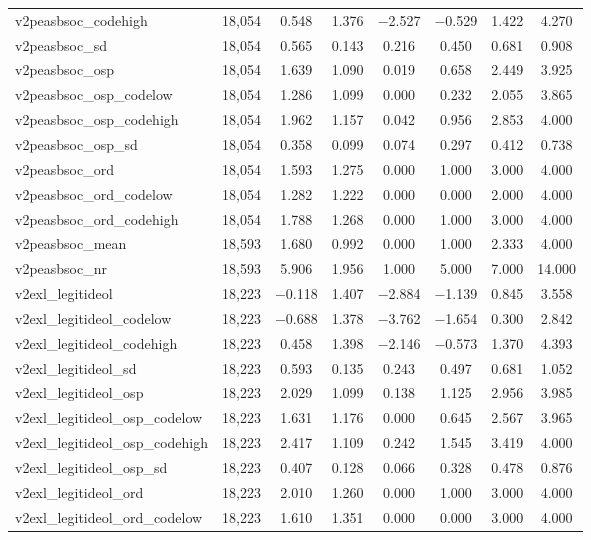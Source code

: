 \begin{table}[!htbp]
\begin{tabular}{@{\extracolsep{5pt}}lccccccc}
v2peasbsoc\_codehigh & 18,054 & 0.548 & 1.376 & $-$2.527 & $-$0.529 & 1.422 & 4.270 \\ 
v2peasbsoc\_sd & 18,054 & 0.565 & 0.143 & 0.216 & 0.450 & 0.681 & 0.908 \\ 
v2peasbsoc\_osp & 18,054 & 1.639 & 1.090 & 0.019 & 0.658 & 2.449 & 3.925 \\ 
v2peasbsoc\_osp\_codelow & 18,054 & 1.286 & 1.099 & 0.000 & 0.232 & 2.055 & 3.865 \\ 
v2peasbsoc\_osp\_codehigh & 18,054 & 1.962 & 1.157 & 0.042 & 0.956 & 2.853 & 4.000 \\ 
v2peasbsoc\_osp\_sd & 18,054 & 0.358 & 0.099 & 0.074 & 0.297 & 0.412 & 0.738 \\ 
v2peasbsoc\_ord & 18,054 & 1.593 & 1.275 & 0.000 & 1.000 & 3.000 & 4.000 \\ 
v2peasbsoc\_ord\_codelow & 18,054 & 1.282 & 1.222 & 0.000 & 0.000 & 2.000 & 4.000 \\ 
v2peasbsoc\_ord\_codehigh & 18,054 & 1.788 & 1.268 & 0.000 & 1.000 & 3.000 & 4.000 \\ 
v2peasbsoc\_mean & 18,593 & 1.680 & 0.992 & 0.000 & 1.000 & 2.333 & 4.000 \\ 
v2peasbsoc\_nr & 18,593 & 5.906 & 1.956 & 1.000 & 5.000 & 7.000 & 14.000 \\ 
v2exl\_legitideol & 18,223 & $-$0.118 & 1.407 & $-$2.884 & $-$1.139 & 0.845 & 3.558 \\ 
v2exl\_legitideol\_codelow & 18,223 & $-$0.688 & 1.378 & $-$3.762 & $-$1.654 & 0.300 & 2.842 \\ 
v2exl\_legitideol\_codehigh & 18,223 & 0.458 & 1.398 & $-$2.146 & $-$0.573 & 1.370 & 4.393 \\ 
v2exl\_legitideol\_sd & 18,223 & 0.593 & 0.135 & 0.243 & 0.497 & 0.681 & 1.052 \\ 
v2exl\_legitideol\_osp & 18,223 & 2.029 & 1.099 & 0.138 & 1.125 & 2.956 & 3.985 \\ 
v2exl\_legitideol\_osp\_codelow & 18,223 & 1.631 & 1.176 & 0.000 & 0.645 & 2.567 & 3.965 \\ 
v2exl\_legitideol\_osp\_codehigh & 18,223 & 2.417 & 1.109 & 0.242 & 1.545 & 3.419 & 4.000 \\ 
v2exl\_legitideol\_osp\_sd & 18,223 & 0.407 & 0.128 & 0.066 & 0.328 & 0.478 & 0.876 \\ 
v2exl\_legitideol\_ord & 18,223 & 2.010 & 1.260 & 0.000 & 1.000 & 3.000 & 4.000 \\ 
v2exl\_legitideol\_ord\_codelow & 18,223 & 1.610 & 1.351 & 0.000 & 0.000 & 3.000 & 4.000 \\ 

\end{tabular}
\end{table}

